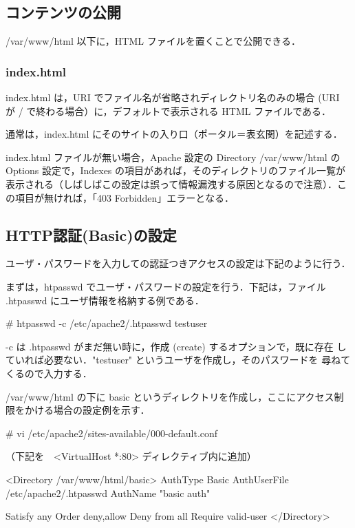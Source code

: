 \subsection{コンテンツの公開}

/var/www/html 以下に，HTML ファイルを置くことで公開できる．

\subsubsection*{index.html}

index.html は，URI でファイル名が省略されディレクトリ名のみの場合 (URI
が / で終わる場合）に，デフォルトで表示される HTML ファイルである．

通常は，index.html にそのサイトの入り口（ポータル＝表玄関）を記述する．

index.html ファイルが無い場合，Apache 設定の Directory /var/www/html の 
Options 設定で，Indexes の項目があれば，そのディレクトリのファイル一覧が
表示される（しばしばこの設定は誤って情報漏洩する原因となるので注意）．こ
の項目が無ければ，「403 Forbidden」エラーとなる．

\subsection{HTTP認証(Basic)の設定}

ユーザ・パスワードを入力しての認証つきアクセスの設定は下記のように行う．

まずは，htpasswd でユーザ・パスワードの設定を行う．下記は，ファイル 
.htpasswd にユーザ情報を格納する例である．

\begin{cli}
# htpasswd -c /etc/apache2/.htpasswd testuser
\end{cli}

-c は .htpasswd がまだ無い時に，作成 (create) するオプションで，既に存在
   していれば必要ない．"testuser" というユーザを作成し，そのパスワードを
   尋ねてくるので入力する．

/var/www/html の下に basic というディレクトリを作成し，ここにアクセス制
限をかける場合の設定例を示す．

\begin{cli}
# vi /etc/apache2/sites-available/000-default.conf

（下記を　<VirtualHost *:80> ディレクティブ内に追加）

<Directory /var/www/html/basic>
        AuthType Basic
        AuthUserFile /etc/apache2/.htpasswd
        AuthName "basic auth"
        
        Satisfy any
        Order deny,allow
        Deny from all
        Require valid-user
</Directory>
\end{cli}

